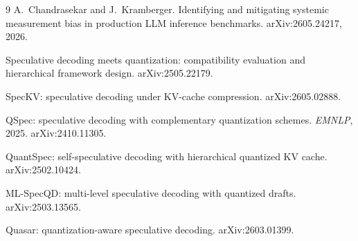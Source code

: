 \documentclass[11pt]{article}
\begin{document}
\begin{thebibliography}{9}
A.~Chandrasekar and J.~Kramberger.
\newblock Identifying and mitigating systemic measurement bias in production
LLM inference benchmarks.
\newblock arXiv:2605.24217, 2026.

Speculative decoding meets quantization: compatibility evaluation and
hierarchical framework design.
\newblock arXiv:2505.22179.

SpecKV: speculative decoding under KV-cache compression.
\newblock arXiv:2605.02888.

QSpec: speculative decoding with complementary quantization schemes.
\newblock \emph{EMNLP}, 2025. arXiv:2410.11305.

QuantSpec: self-speculative decoding with hierarchical quantized KV cache.
\newblock arXiv:2502.10424.

ML-SpecQD: multi-level speculative decoding with quantized drafts.
\newblock arXiv:2503.13565.

Quasar: quantization-aware speculative decoding.
\newblock arXiv:2603.01399.

\end{thebibliography}
\end{document}
